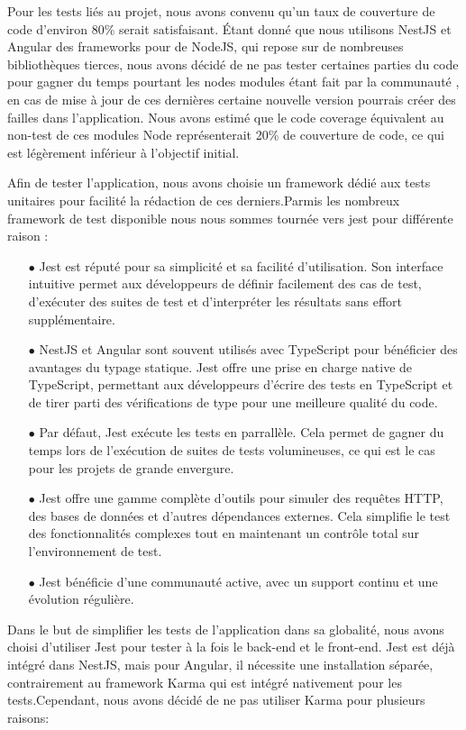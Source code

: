 \documentclass[12pt]{article}
\begin{document}
\justify
\text Pour les tests liés au projet, nous avons convenu qu'un taux de couverture de code d'environ 80\% serait satisfaisant. Étant donné que nous utilisons NestJS et Angular des frameworks pour de NodeJS, qui repose sur de nombreuses bibliothèques tierces, nous avons décidé de ne pas tester certaines parties du code pour gagner du temps pourtant les nodes modules étant fait par la communauté , en cas de mise à jour de ces dernières certaine nouvelle version pourrais créer des failles dans l'application. Nous avons estimé que le code coverage équivalent au non-test de ces modules Node représenterait 20\% de couverture de code, ce qui est légèrement inférieur à l'objectif initial.

\justify
\text Afin de tester l'application, nous avons choisie un framework dédié aux tests unitaires pour facilité la rédaction de ces derniers.Parmis les nombreux framework de test disponible nous nous sommes tournée vers jest pour différente raison : 
\begin{itemize}
    \item[$\bullet$] Jest est réputé pour sa simplicité et sa facilité d'utilisation. Son interface intuitive permet aux développeurs de définir facilement des cas de test, d'exécuter des suites de test et d'interpréter les résultats sans effort supplémentaire.
    \item[$\bullet$]  NestJS et Angular sont souvent utilisés avec TypeScript pour bénéficier des avantages du typage statique. Jest offre une prise en charge native de TypeScript, permettant aux développeurs d'écrire des tests en TypeScript et de tirer parti des vérifications de type pour une meilleure qualité du code.
    \item[$\bullet$] Par défaut, Jest exécute les tests en parrallèle. Cela permet de gagner du temps  lors de l'exécution de suites de tests volumineuses, ce qui est le cas pour les projets de grande envergure.
    \item[$\bullet$] Jest offre une gamme complète d'outils pour simuler des requêtes HTTP, des bases de données et d'autres dépendances externes. Cela simplifie le test des fonctionnalités complexes tout en maintenant un contrôle total sur l'environnement de test.
    \item[$\bullet$] Jest bénéficie d'une communauté active, avec un support continu et une évolution régulière.
\end{itemize}
\justify
\text Dans le but de simplifier les tests de l'application dans sa globalité, nous avons choisi d'utiliser Jest pour tester à la fois le back-end et le front-end. Jest est déjà intégré dans NestJS, mais pour Angular, il nécessite une installation séparée, contrairement au framework Karma qui est intégré nativement pour les tests.Cependant, nous avons décidé de ne pas utiliser Karma pour plusieurs raisons:
\end{document}
